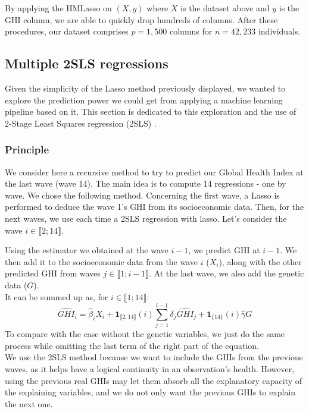 \documentclass[]{article}
\begin{document}
By applying the HMLasso on $(X, y)$ where $X$ is the dataset above and $y$ is the GHI column, we are able to quickly drop hundreds of columns. After these procedures, our dataset comprises $p=1,500$ columns for $n=42,233$ individuals.

\subsection{Multiple 2SLS regressions}
\label{multiple2sls}
Given the simplicity of the Lasso method previously displayed, we wanted to explore the prediction power we could get from applying a machine learning pipeline based on it. This section is dedicated to this exploration and the use of 2-Stage Least Squares regression (2SLS) \cite{2SLS1983}.
\subsubsection{Principle}
We consider here a recursive method to try to predict our Global Health Index at the last wave (wave 14). The main idea is to compute 14 regressions - one by wave. We chose the following method. Concerning the first wave, a Lasso is performed to deduce the wave 1's GHI from its socioeconomic data. Then, for the next waves, we use each time a 2SLS regression with lasso. Let's consider the wave $i \in \llbracket 2; 14 \rrbracket$.

\noindent
Using the estimator we obtained at the wave $i-1$, we predict GHI at $i-1$. We then add it to the socioeconomic data from the wave $i$ ($X_i$), along with the other predicted GHI from waves $j \in \llbracket 1; i-1 \rrbracket$. At the last wave, we also add the genetic data ($G$).\\
It can be summed up as, for $i \in \llbracket 1; 14 \rrbracket$:
\begin{equation}
	\widehat{GHI}_i = \widehat{\beta}_{i}X_i + \textbf{1}_{\llbracket 2; 14 \rrbracket}(i) \sum_{j=1}^{i-1}{\delta_j}\widehat{GHI}_j + \textbf{1}_{\{ 14 \} }(i) \hat{\gamma} G
\end{equation}
To compare with the case without the genetic variables, we just do the same process while omitting the last term of the right part of the equation.\\
We use the 2SLS method because we want to include the GHIs from the previous waves, as it helps have a logical continuity in an observation's health. However, using the previous real GHIs may let them absorb all the explanatory capacity of the explaining variables, and we do not only want the previous GHIs to explain the next one.\\
\end{document}
